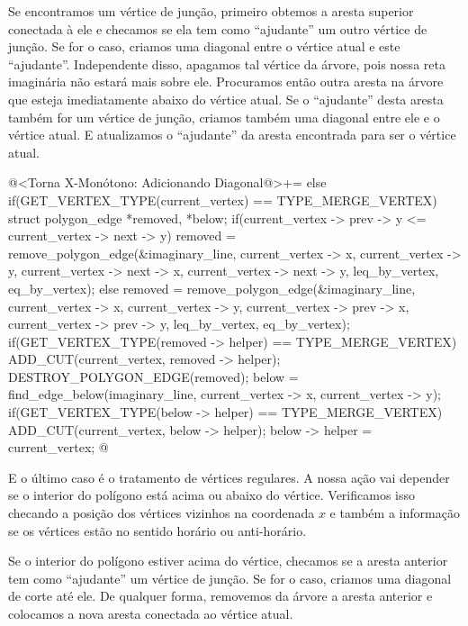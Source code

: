 {{{{{{Se encontramos um vértice de junção, primeiro obtemos a aresta
superior conectada à ele e checamos se ela tem como ``ajudante'' um
outro vértice de junção. Se for o caso, criamos uma diagonal entre o
vértice atual e este ``ajudante''. Independente disso, apagamos tal
vértice da árvore, pois nossa reta imaginária não estará mais sobre
ele. Procuramos então outra aresta na árvore que esteja imediatamente
abaixo do vértice atual. Se o ``ajudante'' desta aresta também for um
vértice de junção, criamos também uma diagonal entre ele e o vértice
atual. E atualizamos o ``ajudante'' da aresta encontrada para ser o
vértice atual.

\iniciocodigo
@<Torna X-Monótono: Adicionando Diagonal@>+=
else if(GET_VERTEX_TYPE(current_vertex) == TYPE_MERGE_VERTEX){
  struct polygon_edge *removed, *below;
  if(current_vertex -> prev -> y <= current_vertex -> next -> y){
    removed = remove_polygon_edge(&imaginary_line, current_vertex -> x,
                                 current_vertex -> y,
                                 current_vertex -> next -> x,
                                 current_vertex -> next -> y,
                                 leq_by_vertex, eq_by_vertex);
  }
  else{
    removed = remove_polygon_edge(&imaginary_line, current_vertex -> x,
                                 current_vertex -> y,
                                 current_vertex -> prev -> x,
                                 current_vertex -> prev -> y,
                                 leq_by_vertex, eq_by_vertex);
  }
  if(GET_VERTEX_TYPE(removed -> helper) == TYPE_MERGE_VERTEX){
    ADD_CUT(current_vertex, removed -> helper);
  }
  DESTROY_POLYGON_EDGE(removed);
  below = find_edge_below(imaginary_line, current_vertex -> x,
                          current_vertex -> y);
  if(GET_VERTEX_TYPE(below -> helper) == TYPE_MERGE_VERTEX){
    ADD_CUT(current_vertex, below -> helper);
  }
  below -> helper = current_vertex;
}
@
\fimcodigo

E o último caso é o tratamento de vértices regulares. A nossa ação vai
depender se o interior do polígono está acima ou abaixo do
vértice. Verificamos isso checando a posição dos vértices vizinhos na
coordenada $x$ e também a informação se os vértices estão no sentido
horário ou anti-horário.

Se o interior do polígono estiver acima do vértice, checamos se a
aresta anterior tem como ``ajudante'' um vértice de junção. Se for o
caso, criamos uma diagonal de corte até ele. De qualquer forma,
removemos da árvore a aresta anterior e colocamos a nova aresta
conectada ao vértice atual.

}}}}}}
